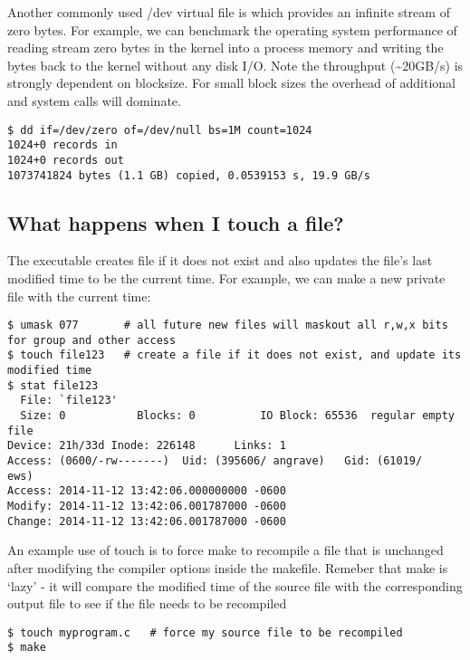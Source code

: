 Another commonly used /dev virtual file is  which provides an infinite stream of zero bytes. For example, we can benchmark the operating system performance of reading stream zero bytes in the kernel into a process memory and writing the bytes back to the kernel without any disk I/O. Note the throughput (\textasciitilde{}20GB/s) is strongly dependent on blocksize. For small block sizes the overhead of additional  and  system calls will dominate.

\begin{lstlisting}
$ dd if=/dev/zero of=/dev/null bs=1M count=1024
1024+0 records in
1024+0 records out
1073741824 bytes (1.1 GB) copied, 0.0539153 s, 19.9 GB/s
\end{lstlisting}

\subsection{What happens when I touch a file?}\label{what-happens-when-i-touch-a-file}

The  executable creates file if it does not exist and also updates the file's last modified time to be the current time. For example, we can make a new private file with the current time:

\begin{lstlisting}
$ umask 077       # all future new files will maskout all r,w,x bits for group and other access
$ touch file123   # create a file if it does not exist, and update its modified time
$ stat file123
  File: `file123'
  Size: 0           Blocks: 0          IO Block: 65536  regular empty file
Device: 21h/33d Inode: 226148      Links: 1
Access: (0600/-rw-------)  Uid: (395606/ angrave)   Gid: (61019/     ews)
Access: 2014-11-12 13:42:06.000000000 -0600
Modify: 2014-11-12 13:42:06.001787000 -0600
Change: 2014-11-12 13:42:06.001787000 -0600
\end{lstlisting}

An example use of touch is to force make to recompile a file that is unchanged after modifying the compiler options inside the makefile. Remeber that make is `lazy' - it will compare the modified time of the source file with the corresponding output file to see if the file needs to be recompiled

\begin{lstlisting}
$ touch myprogram.c   # force my source file to be recompiled
$ make
\end{lstlisting}

